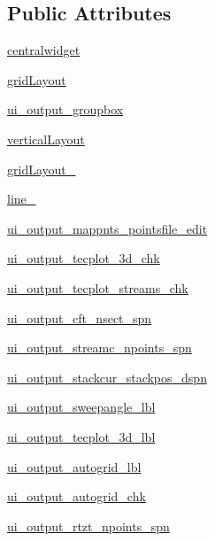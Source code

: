 \subsection*{Public Attributes}
\begin{DoxyCompactItemize}
\item 
\hyperlink{a00074_a99bcc614e5be2356b9b0e54f30bb009e}{centralwidget}
\item 
\hyperlink{a00074_aad085c53319e511b5f37895a71336716}{grid\+Layout}
\item 
\hyperlink{a00074_a342c5c54417df97a32a10f28fe93d81e}{ui\+\_\+output\+\_\+groupbox}
\item 
\hyperlink{a00074_ae33ea0222b6e62c39a7081946f32072a}{vertical\+Layout}
\item 
\hyperlink{a00074_ad528f27c7c549b388b9a6dc2e24f9880}{grid\+Layout\+\_}
\item 
\hyperlink{a00074_a55227446d0a73588ace14f77945ec2ee}{line\+\_}
\item 
\hyperlink{a00074_a8020c73e1cf12f6c112a79f2c34af062}{ui\+\_\+output\+\_\+mappnts\+\_\+pointsfile\+\_\+edit}
\item 
\hyperlink{a00074_a47635280e1268bda03a8e1f69a03fc35}{ui\+\_\+output\+\_\+tecplot\+\_\+3d\+\_\+chk}
\item 
\hyperlink{a00074_a08c1ff077d7bec4a77e7f540b681c71a}{ui\+\_\+output\+\_\+tecplot\+\_\+streams\+\_\+chk}
\item 
\hyperlink{a00074_a7689384c6c651ee544d44f0029a731b5}{ui\+\_\+output\+\_\+cft\+\_\+nsect\+\_\+spn}
\item 
\hyperlink{a00074_a7376266aa4a7bdb95b74e14c4e2294c0}{ui\+\_\+output\+\_\+streamc\+\_\+npoints\+\_\+spn}
\item 
\hyperlink{a00074_a51d1efb48954a11443baee2265fb4a2a}{ui\+\_\+output\+\_\+stackcur\+\_\+stackpos\+\_\+dspn}
\item 
\hyperlink{a00074_ac1c6cd8619b834a5b653a36f784fb43e}{ui\+\_\+output\+\_\+sweepangle\+\_\+lbl}
\item 
\hyperlink{a00074_aacdb4037b930e2ee45ab5c333990a969}{ui\+\_\+output\+\_\+tecplot\+\_\+3d\+\_\+lbl}
\item 
\hyperlink{a00074_aa8b180aa3d27924eb0fe24e40d2bb03e}{ui\+\_\+output\+\_\+autogrid\+\_\+lbl}
\item 
\hyperlink{a00074_ad31bb569d28370ccbd2b76bb7a4b8b89}{ui\+\_\+output\+\_\+autogrid\+\_\+chk}
\item 
\hyperlink{a00074_a726af21c576e9cfa777b00fa72b6eadf}{ui\+\_\+output\+\_\+rtzt\+\_\+npoints\+\_\+spn}
\item 

\end{DoxyCompactItemize}
